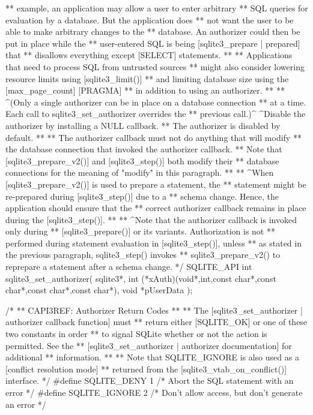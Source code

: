 \begin{Codex}[label=sqlite3.h,numbers=left]
{** example, an application may allow a user to enter arbitrary
** SQL queries for evaluation by a database.  But the application does
** not want the user to be able to make arbitrary changes to the
** database.  An authorizer could then be put in place while the
** user-entered SQL is being [sqlite3_prepare | prepared] that
** disallows everything except [SELECT] statements.
**
** Applications that need to process SQL from untrusted sources
** might also consider lowering resource limits using [sqlite3_limit()]
** and limiting database size using the [max_page_count] [PRAGMA]
** in addition to using an authorizer.
**
** ^(Only a single authorizer can be in place on a database connection
** at a time.  Each call to sqlite3_set_authorizer overrides the
** previous call.)^  ^Disable the authorizer by installing a NULL callback.
** The authorizer is disabled by default.
**
** The authorizer callback must not do anything that will modify
** the database connection that invoked the authorizer callback.
** Note that [sqlite3_prepare_v2()] and [sqlite3_step()] both modify their
** database connections for the meaning of "modify" in this paragraph.
**
** ^When [sqlite3_prepare_v2()] is used to prepare a statement, the
** statement might be re-prepared during [sqlite3_step()] due to a 
** schema change.  Hence, the application should ensure that the
** correct authorizer callback remains in place during the [sqlite3_step()].
**
** ^Note that the authorizer callback is invoked only during
** [sqlite3_prepare()] or its variants.  Authorization is not
** performed during statement evaluation in [sqlite3_step()], unless
** as stated in the previous paragraph, sqlite3_step() invokes
** sqlite3_prepare_v2() to reprepare a statement after a schema change.
*/
SQLITE_API int sqlite3_set_authorizer(
  sqlite3*,
  int (*xAuth)(void*,int,const char*,const char*,const char*,const char*),
  void *pUserData
);

/*
** CAPI3REF: Authorizer Return Codes
**
** The [sqlite3_set_authorizer | authorizer callback function] must
** return either [SQLITE_OK] or one of these two constants in order
** to signal SQLite whether or not the action is permitted.  See the
** [sqlite3_set_authorizer | authorizer documentation] for additional
** information.
**
** Note that SQLITE_IGNORE is also used as a [conflict resolution mode]
** returned from the [sqlite3_vtab_on_conflict()] interface.
*/
#define SQLITE_DENY   1   /* Abort the SQL statement with an error */
#define SQLITE_IGNORE 2   /* Don't allow access, but don't generate an error */

}
\end{Codex}
